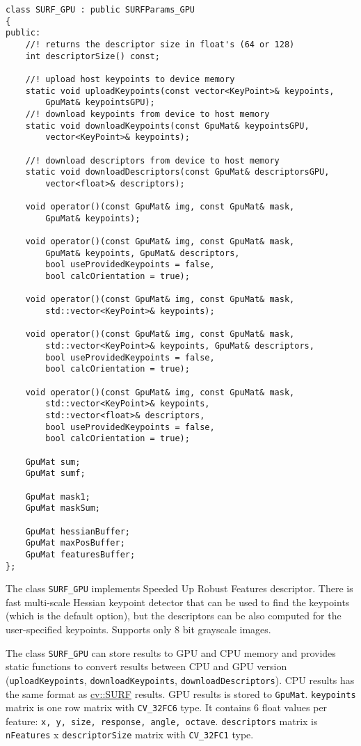\begin{lstlisting}
class SURF_GPU : public SURFParams_GPU
{
public:
    //! returns the descriptor size in float's (64 or 128)
    int descriptorSize() const;

    //! upload host keypoints to device memory
    static void uploadKeypoints(const vector<KeyPoint>& keypoints, 
        GpuMat& keypointsGPU);
    //! download keypoints from device to host memory
    static void downloadKeypoints(const GpuMat& keypointsGPU, 
        vector<KeyPoint>& keypoints);

    //! download descriptors from device to host memory
    static void downloadDescriptors(const GpuMat& descriptorsGPU, 
        vector<float>& descriptors);
    
    void operator()(const GpuMat& img, const GpuMat& mask, 
        GpuMat& keypoints);
    
    void operator()(const GpuMat& img, const GpuMat& mask, 
        GpuMat& keypoints, GpuMat& descriptors, 
        bool useProvidedKeypoints = false, 
        bool calcOrientation = true);

    void operator()(const GpuMat& img, const GpuMat& mask, 
        std::vector<KeyPoint>& keypoints);

    void operator()(const GpuMat& img, const GpuMat& mask, 
        std::vector<KeyPoint>& keypoints, GpuMat& descriptors, 
        bool useProvidedKeypoints = false, 
        bool calcOrientation = true);
    
    void operator()(const GpuMat& img, const GpuMat& mask, 
        std::vector<KeyPoint>& keypoints, 
        std::vector<float>& descriptors, 
        bool useProvidedKeypoints = false, 
        bool calcOrientation = true);

    GpuMat sum;
    GpuMat sumf;

    GpuMat mask1;
    GpuMat maskSum;

    GpuMat hessianBuffer;
    GpuMat maxPosBuffer;
    GpuMat featuresBuffer;
};
\end{lstlisting}

The class \texttt{SURF\_GPU} implements Speeded Up Robust Features descriptor. There is fast multi-scale Hessian keypoint detector that can be used to find the keypoints (which is the default option), but the descriptors can be also computed for the user-specified keypoints. Supports only 8 bit grayscale images.

The class \texttt{SURF\_GPU} can store results to GPU and CPU memory and provides static functions to convert results between CPU and GPU version (\texttt{uploadKeypoints}, \texttt{downloadKeypoints}, \texttt{downloadDescriptors}). CPU results has the same format as \hyperref[cv.class.SURF]{cv::SURF} results. GPU results is stored to \texttt{GpuMat}. \texttt{keypoints} matrix is one row matrix with \texttt{CV\_32FC6} type. It contains 6 float values per feature: \texttt{x, y, size, response, angle, octave}. \texttt{descriptors} matrix is \texttt{nFeatures} x \texttt{descriptorSize} matrix with \texttt{CV\_32FC1} type.

